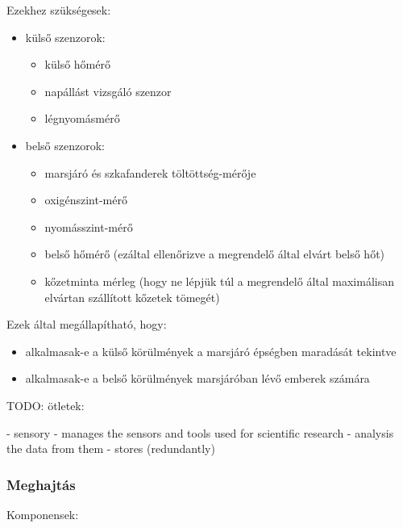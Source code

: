 \documentclass[12pt]{report}
\begin{document}
Ezekhez szükségesek:
\begin{itemize}
  \item külső szenzorok: \begin{itemize}
      \item külső hőmérő
      \item napállást vizsgáló szenzor
      \item légnyomásmérő
    \end{itemize}
  \item belső szenzorok: \begin{itemize}
      \item marsjáró és szkafanderek töltöttség-mérője
      \item oxigénszint-mérő
      \item nyomásszint-mérő
      \item belső hőmérő (ezáltal ellenőrizve a megrendelő által elvárt belső hőt)
      \item kőzetminta mérleg (hogy ne lépjük túl a megrendelő által maximálisan elvártan szállított kőzetek tömegét)
    \end{itemize}
\end{itemize}

Ezek által megállapítható, hogy:
\begin{itemize}
  \item alkalmasak-e a külső körülmények a marsjáró épségben maradását tekintve
  \item alkalmasak-e a belső körülmények marsjáróban lévő emberek számára
\end{itemize}

TODO: 
ötletek:

- sensory
  - manages the sensors and tools used for scientific research
  - analysis the data from them
  - stores (redundantly)

\subsubsection{Meghajtás}

Komponensek:
\end{document}
